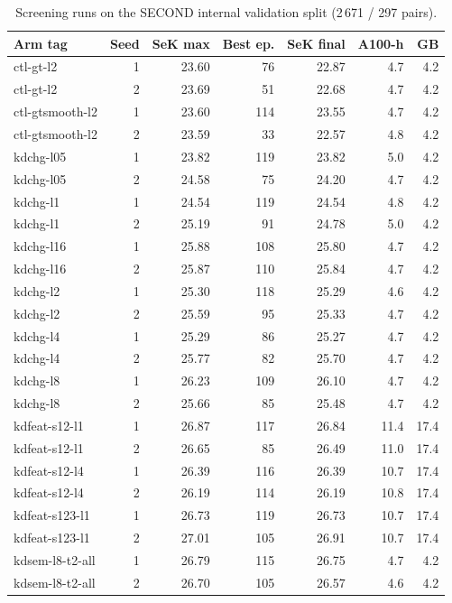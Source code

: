 \begin{table}[!t]
\centering
\footnotesize
\caption{Screening runs on the SECOND internal validation split (2\,671 / 297 pairs).}
\label{tab:s-screening-runs}
\begin{tabular}{lrrrrrr}
\toprule
Arm tag & Seed & SeK max & Best ep. & SeK final & A100-h & GB \\
\midrule
ctl-gt-l2 & 1 & 23.60 & 76 & 22.87 & 4.7 & 4.2 \\
ctl-gt-l2 & 2 & 23.69 & 51 & 22.68 & 4.7 & 4.2 \\
ctl-gtsmooth-l2 & 1 & 23.60 & 114 & 23.55 & 4.7 & 4.2 \\
ctl-gtsmooth-l2 & 2 & 23.59 & 33 & 22.57 & 4.8 & 4.2 \\
kdchg-l05 & 1 & 23.82 & 119 & 23.82 & 5.0 & 4.2 \\
kdchg-l05 & 2 & 24.58 & 75 & 24.20 & 4.7 & 4.2 \\
kdchg-l1 & 1 & 24.54 & 119 & 24.54 & 4.8 & 4.2 \\
kdchg-l1 & 2 & 25.19 & 91 & 24.78 & 5.0 & 4.2 \\
kdchg-l16 & 1 & 25.88 & 108 & 25.80 & 4.7 & 4.2 \\
kdchg-l16 & 2 & 25.87 & 110 & 25.84 & 4.7 & 4.2 \\
kdchg-l2 & 1 & 25.30 & 118 & 25.29 & 4.6 & 4.2 \\
kdchg-l2 & 2 & 25.59 & 95 & 25.33 & 4.7 & 4.2 \\
kdchg-l4 & 1 & 25.29 & 86 & 25.27 & 4.7 & 4.2 \\
kdchg-l4 & 2 & 25.77 & 82 & 25.70 & 4.7 & 4.2 \\
kdchg-l8 & 1 & 26.23 & 109 & 26.10 & 4.7 & 4.2 \\
kdchg-l8 & 2 & 25.66 & 85 & 25.48 & 4.7 & 4.2 \\
kdfeat-s12-l1 & 1 & 26.87 & 117 & 26.84 & 11.4 & 17.4 \\
kdfeat-s12-l1 & 2 & 26.65 & 85 & 26.49 & 11.0 & 17.4 \\
kdfeat-s12-l4 & 1 & 26.39 & 116 & 26.39 & 10.7 & 17.4 \\
kdfeat-s12-l4 & 2 & 26.19 & 114 & 26.19 & 10.8 & 17.4 \\
kdfeat-s123-l1 & 1 & 26.73 & 119 & 26.73 & 10.7 & 17.4 \\
kdfeat-s123-l1 & 2 & 27.01 & 105 & 26.91 & 10.7 & 17.4 \\
kdsem-l8-t2-all & 1 & 26.79 & 115 & 26.75 & 4.7 & 4.2 \\
kdsem-l8-t2-all & 2 & 26.70 & 105 & 26.57 & 4.6 & 4.2 \\

\end{tabular}
\end{table}
